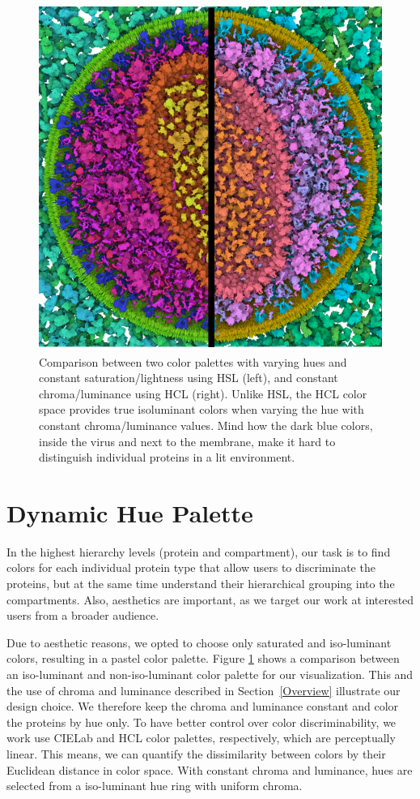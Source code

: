 \documentclass[review,journal]{vgtc}         %
\begin{document}
	
	\begin{figure}
		\centering
		\includegraphics[width=0.75\linewidth]{Figures/hslvshcl}
		\caption{Comparison between two color palettes with varying hues and constant saturation/lightness using HSL (left), and constant chroma/luminance using HCL (right). 
		Unlike HSL, the HCL color space provides true isoluminant colors when varying the hue with constant chroma/luminance values.
		 Mind how the dark blue colors, inside the virus and next to the membrane, make it hard to distinguish individual proteins in a lit environment.}
		\label{fig:hslvshcl}
	\end{figure}
	
	
	
	\section{Dynamic Hue Palette}
	\label{sec:hue}
	
	In the highest hierarchy levels (protein and compartment), our task is to find colors for each individual protein type that allow users to discriminate the proteins, but at the same time understand their hierarchical grouping into the compartments. 
	Also, aesthetics are important, as we target our work at interested users from a broader audience. 
	
	Due to aesthetic reasons, we opted to choose only saturated and iso-luminant colors, resulting in a pastel color palette. 
	Figure \ref{fig:hslvshcl} shows a comparison between an iso-luminant and non-iso-luminant color palette for our visualization. This and the use of chroma and luminance described in Section~\ref{Overview} illustrate our design choice. 
	We therefore keep the chroma and luminance constant and color the proteins by hue only. 
	To have better control over color discriminability, we work use CIELab and HCL color palettes, respectively, which are perceptually linear. 
	This means, we can quantify the dissimilarity between colors by their Euclidean distance in color space. 
	With constant chroma and luminance, hues are selected from a iso-luminant hue ring with uniform chroma. 
	
\end{document}
